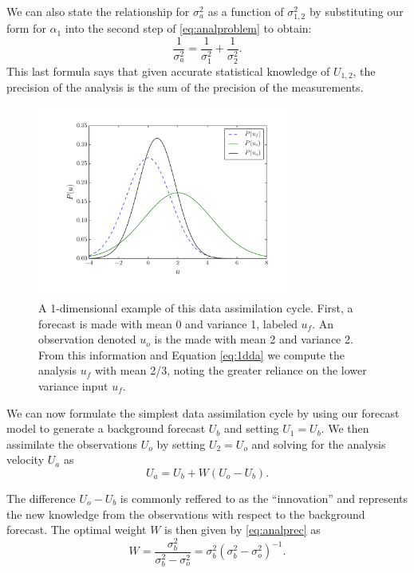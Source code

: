 \documentclass[12pt]{report}
\begin{document}
We can also state the relationship for $\sigma _a ^2$ as a function of $\sigma_{1,2}^2$ by substituting our form for $\alpha _1$ into the second step of \ref{eq:analproblem} to obtain:
\begin{equation} \frac{1}{\sigma _a ^2} = \frac{1}{\sigma _1^2} + \frac{1}{\sigma_2^2} .\label{eq:analprec} \end{equation}
This last formula says that given accurate statistical knowledge of $U_{1,2}$, the precision of the analysis is the sum of the precision of the measurements.

\begin{figure}[t!]
  \centering
      \includegraphics[width=0.75\textwidth]{figures/DA-example03-labels.pdf}
  \caption[A 1-dimensional example of this data assimilation cycle]{
    A 1-dimensional example of this data assimilation cycle.
    First, a forecast is made with mean 0 and variance 1, labeled $u_f$.
    An observation denoted $u_o$ is the made with mean 2 and variance 2.
    From this information and Equation \ref{eq:1dda} we compute the analysis $u_f$ with mean 2/3, noting the greater reliance on the lower variance input $u_f$.
  }
  \label{fig:DAexample1D}
\end{figure}

We can now formulate the simplest data assimilation cycle by using our forecast model to generate a background forecast $U_b$ and setting $U_1 = U_b$.
We then assimilate the observations $U_o$ by setting $U_2 = U_o$ and solving for the analysis velocity $U_a$ as
\begin{equation} U_a = U_b + W (U_o - U_b) .\end{equation}

The difference $U_o - U_b$ is commonly reffered to as the ``innovation'' and represents the new knowledge from the observations with respect to the background forecast.
The optimal weight $W$ is then given by \ref{eq:analprec} as
\begin{equation} W = \frac{\sigma _b ^2}{\sigma_b ^2 - \sigma _o ^2} = \sigma_b ^2 (\sigma_b^2 - \sigma_o^2) ^{-1} \label{eq:1dda}.\end{equation}
\end{document}
